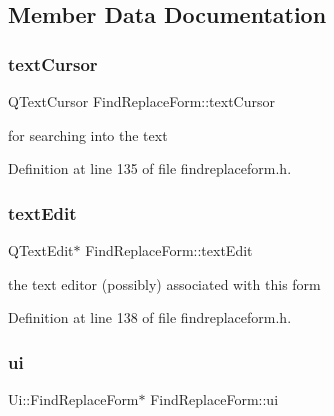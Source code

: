 \subsection{Member Data Documentation}
\mbox{\label{class_find_replace_form_acbbc970423e9e4dfcee99d53e02d8eb2}} 
\subsubsection{\texorpdfstring{text\+Cursor}{textCursor}}
{\footnotesize\ttfamily Q\+Text\+Cursor Find\+Replace\+Form\+::text\+Cursor\hspace{0.3cm}{\ttfamily [protected]}}



for searching into the text 



Definition at line 135 of file findreplaceform.\+h.

\mbox{\label{class_find_replace_form_a6ddb6c32035bcafdd085c457c1ac125c}} 
\subsubsection{\texorpdfstring{text\+Edit}{textEdit}}
{\footnotesize\ttfamily Q\+Text\+Edit$\ast$ Find\+Replace\+Form\+::text\+Edit\hspace{0.3cm}{\ttfamily [protected]}}



the text editor (possibly) associated with this form 



Definition at line 138 of file findreplaceform.\+h.

\mbox{\label{class_find_replace_form_a9bf9e9096feff863dcd6c2a989e07d2c}} 
\subsubsection{\texorpdfstring{ui}{ui}}
{\footnotesize\ttfamily Ui\+::\+Find\+Replace\+Form$\ast$ Find\+Replace\+Form\+::ui\hspace{0.3cm}{\ttfamily [protected]}}



